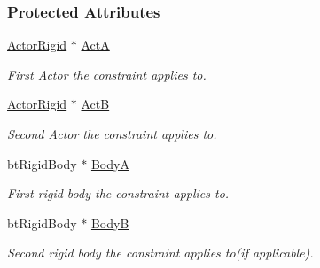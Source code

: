 \subsubsection*{Protected Attributes}
\begin{DoxyCompactItemize}
\item 
\hypertarget{classMezzanine_1_1TypedConstraint_ac6f4f81ec03b0c92f1f2e032aa315b89}{
\hyperlink{classMezzanine_1_1ActorRigid}{ActorRigid} $\ast$ \hyperlink{classMezzanine_1_1TypedConstraint_ac6f4f81ec03b0c92f1f2e032aa315b89}{ActA}}
\label{classMezzanine_1_1TypedConstraint_ac6f4f81ec03b0c92f1f2e032aa315b89}

\begin{DoxyCompactList}\small\item\em First Actor the constraint applies to. \item\end{DoxyCompactList}\item 
\hypertarget{classMezzanine_1_1TypedConstraint_a11e37e116476a8ff1770ad65b7c70f2e}{
\hyperlink{classMezzanine_1_1ActorRigid}{ActorRigid} $\ast$ \hyperlink{classMezzanine_1_1TypedConstraint_a11e37e116476a8ff1770ad65b7c70f2e}{ActB}}
\label{classMezzanine_1_1TypedConstraint_a11e37e116476a8ff1770ad65b7c70f2e}

\begin{DoxyCompactList}\small\item\em Second Actor the constraint applies to. \item\end{DoxyCompactList}\item 
\hypertarget{classMezzanine_1_1TypedConstraint_ac0c9462614bd52f57504bf4232f3ad6f}{
btRigidBody $\ast$ \hyperlink{classMezzanine_1_1TypedConstraint_ac0c9462614bd52f57504bf4232f3ad6f}{BodyA}}
\label{classMezzanine_1_1TypedConstraint_ac0c9462614bd52f57504bf4232f3ad6f}

\begin{DoxyCompactList}\small\item\em First rigid body the constraint applies to. \item\end{DoxyCompactList}\item 
\hypertarget{classMezzanine_1_1TypedConstraint_a20797ccd702ed79065392e384b3dc32b}{
btRigidBody $\ast$ \hyperlink{classMezzanine_1_1TypedConstraint_a20797ccd702ed79065392e384b3dc32b}{BodyB}}
\label{classMezzanine_1_1TypedConstraint_a20797ccd702ed79065392e384b3dc32b}

\begin{DoxyCompactList}\small\item\em Second rigid body the constraint applies to(if applicable). \item\end{DoxyCompactList}\end{DoxyCompactItemize}
